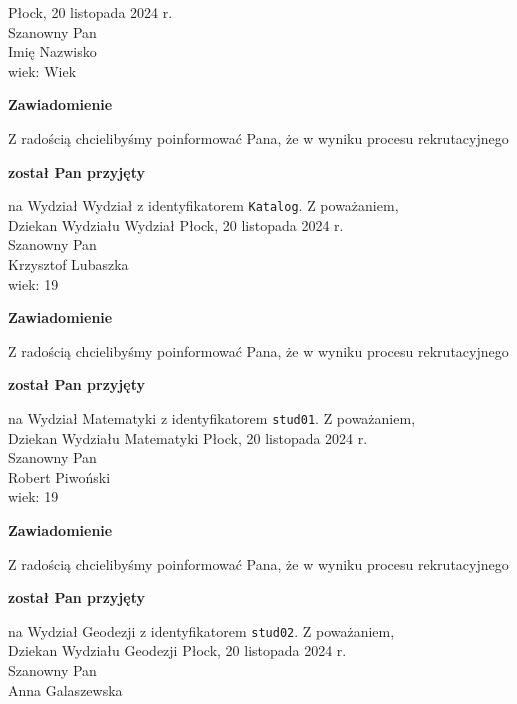 \documentclass[12pt,a4paper]{article}
\begin{document}
\hfill Płock, 20 listopada 2024 r.\\
\noindent 
Szanowny Pan \\
Imię Nazwisko \\
wiek: Wiek
\bigskip
\begin{center}
 	{\Large\textbf{Zawiadomienie}}
\end{center}
\bigskip
Z radością chcielibyśmy poinformować Pana, że w wyniku procesu rekrutacyjnego 
\begin{center}
\textsf{\textbf{został Pan przyjęty}} 
\end{center}
na Wydział Wydział z identyfikatorem \verb|Katalog|. 
\vspace{2cm}
\noindent
Z poważaniem,\\
Dziekan
Wydziału Wydział
\newpage
\hfill Płock, 20 listopada 2024 r.\\
\noindent 
Szanowny Pan \\
Krzysztof Lubaszka \\
wiek: 19
\bigskip
\begin{center}
 	{\Large\textbf{Zawiadomienie}}
\end{center}
\bigskip
Z radością chcielibyśmy poinformować Pana, że w wyniku procesu rekrutacyjnego 
\begin{center}
\textsf{\textbf{został Pan przyjęty}} 
\end{center}
na Wydział Matematyki z identyfikatorem \verb|stud01|. 
\vspace{2cm}
\noindent
Z poważaniem,\\
Dziekan
Wydziału Matematyki
\newpage
\hfill Płock, 20 listopada 2024 r.\\
\noindent 
Szanowny Pan \\
Robert Piwoński  \\
wiek: 19
\bigskip
\begin{center}
 	{\Large\textbf{Zawiadomienie}}
\end{center}
\bigskip
Z radością chcielibyśmy poinformować Pana, że w wyniku procesu rekrutacyjnego 
\begin{center}
\textsf{\textbf{został Pan przyjęty}} 
\end{center}
na Wydział Geodezji z identyfikatorem \verb|stud02|. 
\vspace{2cm}
\noindent
Z poważaniem,\\
Dziekan
Wydziału Geodezji
\newpage
\hfill Płock, 20 listopada 2024 r.\\
\noindent 
Szanowny Pan \\
Anna Galaszewska  \\
\end{document}
